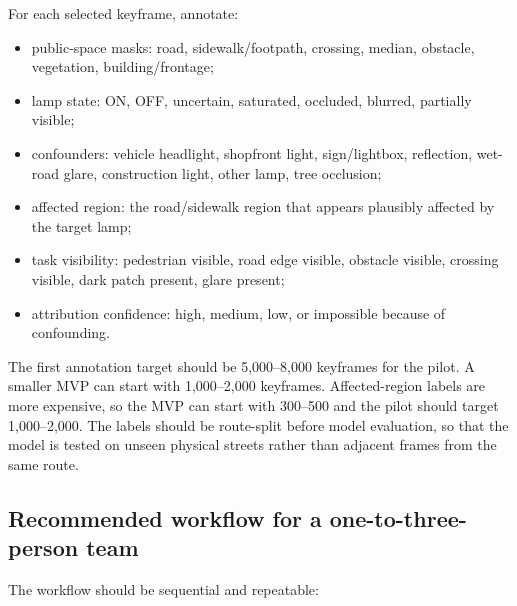 \documentclass[11pt]{article}
\begin{document}
For each selected keyframe, annotate:
\begin{itemize}
  \item public-space masks: road, sidewalk/footpath, crossing, median, obstacle, vegetation, building/frontage;
  \item lamp state: ON, OFF, uncertain, saturated, occluded, blurred, partially visible;
  \item confounders: vehicle headlight, shopfront light, sign/lightbox, reflection, wet-road glare, construction light, other lamp, tree occlusion;
  \item affected region: the road/sidewalk region that appears plausibly affected by the target lamp;
  \item task visibility: pedestrian visible, road edge visible, obstacle visible, crossing visible, dark patch present, glare present;
  \item attribution confidence: high, medium, low, or impossible because of confounding.
\end{itemize}

The first annotation target should be 5,000--8,000 keyframes for the pilot. A smaller MVP can start with 1,000--2,000 keyframes. Affected-region labels are more expensive, so the MVP can start with 300--500 and the pilot should target 1,000--2,000. The labels should be route-split before model evaluation, so that the model is tested on unseen physical streets rather than adjacent frames from the same route.

\subsection{Recommended workflow for a one-to-three-person team}

The workflow should be sequential and repeatable:
\end{document}
